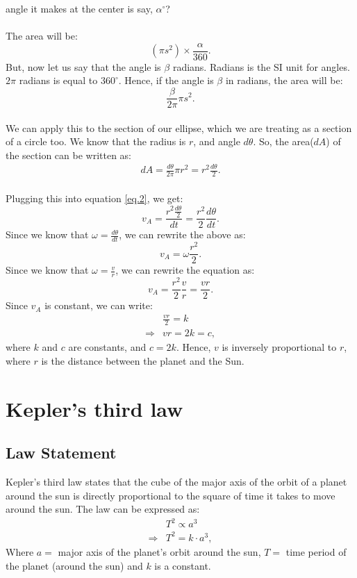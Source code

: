 \documentclass[a4paper]{report}
\begin{document}
angle it makes at the center is say, $\alpha^{\circ}$? \\\\
The area will be: $$(\pi s^2)\times \frac{\alpha}{360}.$$
But, now let us say that the angle is $\beta$ radians. Radians is the SI unit for angles. $2\pi$ radians is 
equal to $360^{\circ}.$ Hence, if the angle is $\beta$ in radians, the area will be: 
$$\frac{\beta}{2\pi}\pi s^2.$$
\\
We can apply this to the section of our ellipse, which we are treating as a section of a circle too. 
We know that the radius is $r$, and angle $d\theta$. So, the area($dA$) of the section can be written as:
\begin{align}\label{eq.3}
  dA=\frac{d\theta}{2\pi}\pi r^2=r^2\frac{d\theta}{2}.
\end{align}
\\
Plugging this into equation \ref{eq.2}, we get: 
$$v_A=\frac{r^2\frac{d\theta}{2}}{dt}=\frac{r^2}{2}\frac{d\theta}{dt}.$$
Since we know that $\omega=\frac{d\theta}{dt}$, we can rewrite the above as: $$v_A=\omega\frac{r^2}{2}.$$
Since we know that $\omega=\frac{v}{r}$, we can rewrite the equation as:
$$v_A=\frac{r^2}{2}\frac{v}{r}=\frac{vr}{2}.$$
Since $v_A$ is constant, we can write:
\begin{align*}
  &\frac{vr}{2}=k\\
  \Rightarrow &\boxed{vr=2k=c},
\end{align*}
where $k$ and $c$ are constants, and $c=2k.$
Hence, $v$ is inversely proportional to $r$, where $r$ is the distance between the planet and the Sun.

\section{Kepler's third law}
\subsection{Law Statement}
Kepler's third law states that the cube of the major axis of the orbit of a planet around the sun is directly 
proportional to the square of time it takes to move around the sun. The law can be expressed as: 
\begin{align*}
  &T^2\propto a^3\\
  \Rightarrow &T^2 = k\cdot a^3,
\end{align*}
Where $a =$ major axis of the planet's orbit around the sun, $T =$ time period of the planet (around the sun)
and $k$ is a constant.\\
\end{document}
